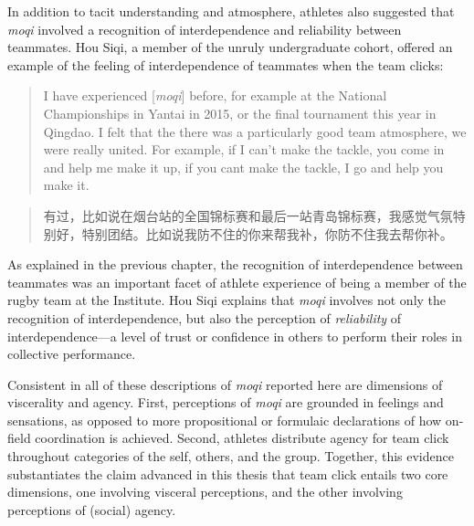 \begin{CJK}{UTF8}{gbsn}
In addition to tacit understanding and atmosphere, athletes also suggested that \textit{moqi} involved a recognition of interdependence and reliability between teammates.  Hou Siqi, a member of the unruly undergraduate cohort, offered an example of the feeling of interdependence of teammates when the team clicks:

  \begin{quote}
    I have experienced [\textit{moqi}] before, for example at the National Championships in Yantai in 2015, or the final tournament this year in Qingdao.  I felt that the there was a particularly good team atmosphere, we were really united.  For example, if I can't make the tackle, you come in and help me make it up, if you cant make the tackle, I go and help you make it.
  \end{quote}

  \begin{quote}
    有过，比如说在烟台站的全国锦标赛和最后一站青岛锦标赛，我感觉气氛特别好，特别团结。比如说我防不住的你来帮我补，你防不住我去帮你补。
  \end{quote}

As explained in the previous chapter, the recognition of interdependence between teammates was an important facet of athlete experience of being a member of the rugby team at the Institute.  Hou Siqi explains that \textit{moqi} involves not only the recognition of interdependence, but also the perception of \textit{reliability} of interdependence---a level of trust or confidence in others to perform their roles in collective performance.


Consistent in all of these descriptions of \textit{moqi} reported here are dimensions of viscerality and agency.  First, perceptions of \textit{moqi} are grounded in feelings and sensations, as opposed to more propositional or formulaic declarations of how on-field coordination is achieved.  Second, athletes distribute agency for team click throughout categories of the self, others, and the group.  Together, this evidence substantiates the claim advanced in this thesis that team click entails two core dimensions, one involving visceral perceptions, and the other involving perceptions of (social) agency.



\end{CJK}
